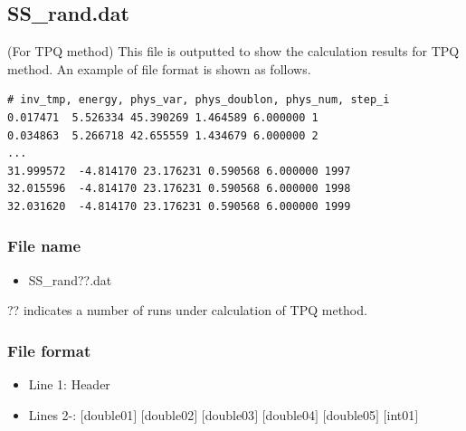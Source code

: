 \newpage
\subsection{SS\_rand.dat}
\label{Subsec:ssrand}
(For TPQ method) This file is outputted to show the calculation results for TPQ method.
An example of file format is shown as follows.\\
\begin{minipage}{15cm}
\begin{screen}
\begin{verbatim}
# inv_tmp, energy, phys_var, phys_doublon, phys_num, step_i
0.017471  5.526334 45.390269 1.464589 6.000000 1
0.034863  5.266718 42.655559 1.434679 6.000000 2
...
31.999572  -4.814170 23.176231 0.590568 6.000000 1997
32.015596  -4.814170 23.176231 0.590568 6.000000 1998
32.031620  -4.814170 23.176231 0.590568 6.000000 1999
\end{verbatim}
\end{screen}
\end{minipage}

\subsubsection{File name}
 \begin{itemize}
   \item SS\_rand??.dat
  \end{itemize}
  ?? indicates a number of runs under calculation of TPQ method.

\subsubsection{File format}
\begin{itemize}
   \item Line 1: Header
   \item Lines 2-: $[$double01$]$ $[$double02$]$ $[$double03$]$ $[$double04$]$ $[$double05$]$ $[$int01$]$
  \end{itemize}
